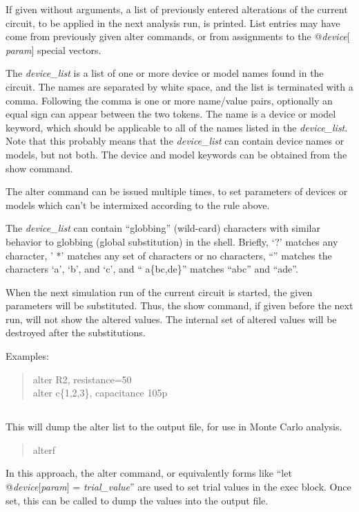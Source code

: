 If given without arguments, a list of previously entered alterations
of the current circuit, to be applied in the next analysis run, is
printed.  List entries may have come from previously given {\cb alter}
commands, or from assignments to the {\vt @}{\it device\/}{\vt [}{\it
param\/}{\vt ]} special vectors.

The {\it device\_list} is a list of one or more device or model names
found in the circuit.  The names are separated by white space, and the
list is terminated with a comma.  Following the comma is one or more
name/value pairs, optionally an equal sign can appear between the two
tokens.  The name is a device or model keyword, which should be
applicable to all of the names listed in the {\it device\_list}.  Note
that this probably means that the {\it device\_list} can contain
device names or models, but not both.  The device and model keywords
can be obtained from the {\cb show} command.

The {\cb alter} command can be issued multiple times, to set
parameters of devices or models which can't be intermixed according to
the rule above.

The {\it device\_list} can contain ``globbing'' (wild-card)
characters with similar behavior to globbing (global substitution) in
the {\WRspice} shell.  Briefly, `{\vt ?}' matches any character, '{\vt
*}' matches any set of characters or no characters, ``{\vt [abc]}''
matches the characters `{\vt a}', `{\vt b}', and `{\vt c}', and ``{\vt
a}\{{\vt bc,de}\}'' matches ``{\vt abc}'' and ``{\vt ade}''.

When the next simulation run of the current circuit is started, the
given parameters will be substituted.  Thus, the {\cb show} command,
if given before the next run, will not show the altered values.  The
internal set of altered values will be destroyed after the
substitutions.

Examples:
\begin{quote}
{\vt alter R2, resistance=50}\\
{\vt alter c\{1,2,3\}, capacitance 105p}
\end{quote}

\subsection{}


This will dump the alter list to the output file, for use in Monte
Carlo analysis.
\begin{quote}\vt
alterf
\end{quote}
In this approach, the {\cb alter} command, or equivalently forms like
``{\vt let @}{\it device\/}{\vt [}{\it param\/}{\vt ]} {\vt =} {\it
trial\_value}'' are used to set trial values in the {\vt exec} block. 
Once set, this can be called to dump the values into the output file.

